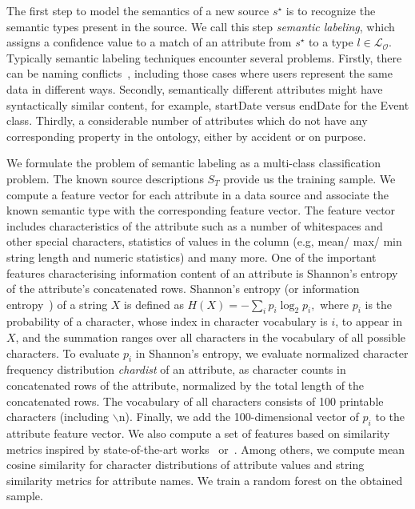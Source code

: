 \documentclass[letterpaper]{article} %
\newcommand{\authornote}[3]{
  {\fbox{\sc 
  #1}:$\blacktriangleright$\textcolor{#2}{\small{#3}}$\blacktriangleleft$}%
}
\newcommand{\ddg}[1]{\authornote{DDG}{blue}{#1}}
\begin{document}
The first step to model the semantics of a new source $s^\star$ is to recognize the semantic types present in the source. 
We call this step \emph{semantic labeling}, which assigns a confidence value to a match of an attribute from $s^\star$ to a type $l \in 
\mathcal{L_O}$.
Typically semantic labeling techniques encounter several problems.
Firstly, there can be naming conflicts~\cite{Pinkel:rodi}, including those cases where users represent the same data in different ways.
Secondly, semantically different attributes might have syntactically similar content, for example, startDate versus endDate for the Event class.
Thirdly, a considerable number of attributes which do not have any corresponding property in the ontology, either by accident or on purpose.

We formulate the problem of semantic labeling as a multi-class classification
problem.
The known source descriptions $S_T$ provide us the training sample.
We compute a feature vector for each attribute in a data source and associate 
the known semantic type with the corresponding feature vector.
The feature vector includes characteristics of the attribute such as a number of whitespaces and other special characters, statistics of values in the column (e.g, mean/ max/ min string length and numeric statistics) and many more.
One of the important features characterising information content of an attribute is Shannon's entropy of the attribute's concatenated rows.
Shannon's entropy (or information entropy~\cite{Manning:Introduction}) of a string $X$ is defined as
$H(X) = -\sum_{i}{p_i \log_{2}p_i},$ where $p_i$ is the probability of a character, whose index in character vocabulary is $i$, to appear in $X$, and the summation ranges over all
characters in the vocabulary of all possible characters.
To evaluate $p_i$ in Shannon's entropy, we evaluate normalized character frequency distribution \emph{chardist} of an attribute, as character counts in concatenated rows of the attribute, normalized by the total length of the concatenated rows.
The vocabulary of all characters consists of 100 printable characters (including $\backslash$n).
Finally, we add the 100-dimensional vector of $p_i$ to the attribute feature vector.
We also compute a set of features based on similarity metrics inspired by state-of-the-art works~\cite{Pham:semantic} or~\cite{Ritze:matching}.
Among others, we compute mean cosine similarity for character distributions of attribute values and string similarity metrics for attribute names.
We train a random forest on the obtained sample. 
\end{document}
